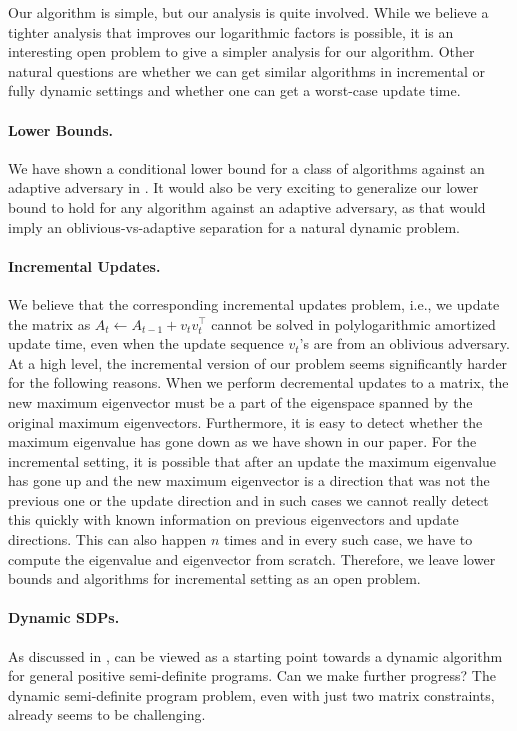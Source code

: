 \documentclass[11pt]{article}
\newcommand\vv{\boldsymbol{\mathit{v}}}
\renewcommand\AA{\boldsymbol{\mathit{A}}}
\begin{document}
Our algorithm is simple, but our analysis is quite involved. While we believe a tighter analysis that improves our logarithmic factors is possible, it is an interesting open problem to give a simpler analysis for our algorithm. 
Other natural questions are whether we can get similar algorithms in incremental or fully dynamic settings and whether one can get a worst-case update time.


\paragraph{Lower Bounds.}
We have shown a conditional lower bound for a class of algorithms against an adaptive adversary in . It would also be very exciting to generalize our lower bound to hold for any algorithm against an adaptive adversary, as that would imply an oblivious-vs-adaptive separation for a natural dynamic problem. 

\paragraph{Incremental Updates.} We believe that the corresponding incremental updates problem, i.e., we update the matrix as $\AA_t \gets \AA_{t-1}+\vv_t\vv_t^{\top}$ cannot be solved in polylogarithmic amortized update time, even when the update sequence $\vv_t$'s are from an oblivious adversary. 
At a high level, the incremental version of our problem seems significantly harder for the following reasons. When we perform decremental updates to a matrix, the new maximum eigenvector must be a part of the eigenspace spanned by the original maximum eigenvectors. Furthermore, it is easy to detect whether the maximum eigenvalue has gone down as we have shown in our paper. For the incremental setting, it is possible that after an update the maximum eigenvalue has gone up and the new maximum eigenvector is a direction that was not the previous one or the update direction and in such cases we cannot really detect this quickly with known information on previous eigenvectors and update directions. This can also happen $n$ times and in every such case, we have to compute the eigenvalue and eigenvector from scratch. Therefore, we leave lower bounds and algorithms for incremental setting as an open problem. 

\paragraph{Dynamic SDPs.}
As discussed in ,  can be viewed as a starting point towards a dynamic algorithm for general positive semi-definite programs. Can we make further progress? The dynamic semi-definite program problem, even with just two matrix constraints, already seems to be challenging. 
\end{document}
